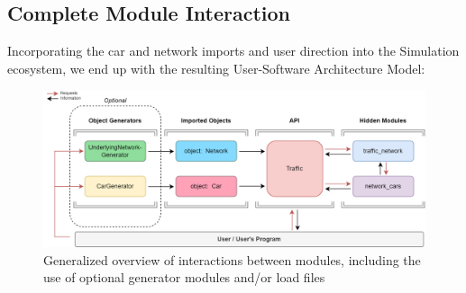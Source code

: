 \subsection{Complete Module Interaction}

\par Incorporating the car and network imports and user direction into the Simulation ecosystem, we end up with the resulting User-Software Architecture Model:

\begin{figure}[H]
    \centering
	\includegraphics[width=\textwidth]{tex files/Figures/complete_architecture.png}
	\caption[User-Software Interaction]{Generalized overview of interactions between modules, including the use of optional generator modules and/or load files}
	\label{fig:modules_all}
\end{figure}






